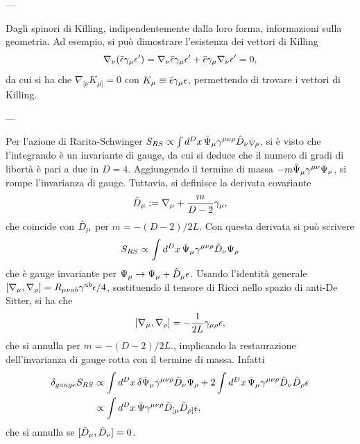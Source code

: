 ---

Dagli spinori di Killing, indipendentemente dalla loro forma, informazioni sulla geometria. Ad esempio, si può dimostrare l'esistenza dei vettori di Killing 
\begin{equation}
    \nabla_\nu(\bar{\epsilon}\gamma_\mu\epsilon') = \nabla_\nu\bar{\epsilon}\gamma_\mu\epsilon' + \bar{\epsilon}\gamma_\mu\nabla_\nu\epsilon' = 0,
\end{equation}
da cui si ha che $\nabla_{[\nu}K_{\mu]} = 0$ con $K_\mu \equiv \bar{\epsilon}\gamma_\mu\epsilon$, permettendo di trovare i vettori di Killing. 

---

Per l'azione di Rarita-Schwinger $S_{RS} \propto \int d^Dx\,\bar{\Psi}_\mu\gamma^{\mu\nu\rho}\hat{D}_\nu\psi_\rho$, si è visto che l'integrando è un invariante di gauge, da cui si deduce che il numero di gradi di libertà è pari a due in $D = 4$. Aggiungendo il termine di massa $-m\bar{\Psi}_\mu\gamma^{\mu\nu}\Psi_\nu$, si rompe l'invarianza di gauge. Tuttavia, si definisce la derivata covariante
\begin{equation}
    \tilde{D}_\mu := \nabla_\mu + \frac{m}{D - 2}\gamma_\mu,
\end{equation}
che coincide con $\hat{D}_\mu$ per $m = -(D - 2)/2L$. Con questa derivata si può scrivere 
\begin{equation}
    S_{RS} \propto \int d^Dx\,\bar{\Psi}_\mu\gamma^{\mu\nu\rho}\tilde{D}_\nu\Psi_\rho
\end{equation}
che è gauge invariante per $\Psi_\mu \to \Psi_\mu + \tilde{D}_\mu\epsilon$. Usando l'identità generale $[\nabla_\mu,\nabla_\rho] = R_{\mu\nu ab}\gamma^{ab}\epsilon/4$, sostituendo il tensore di Ricci nello spazio di anti-De Sitter, si ha che 
\begin{equation}
    [\nabla_\mu,\nabla_\rho] = -\frac{1}{2L}\gamma_{\mu\rho}\epsilon,
\end{equation}
che si annulla per $m = -(D - 2)/2L$., implicando la restaurazione dell'invarianza di gauge rotta con il termine di massa. Infatti
\begin{equation}
    \begin{split}
        \delta_{gauge}S_{RS} &\propto \int d^Dx\,\delta\bar{\Psi}_\mu\gamma^{\mu\nu\rho}\tilde{D}_\nu\Psi_\rho + 2\int d^Dx\,\bar{\Psi}_\mu\gamma^{\mu\nu\rho}\tilde{D}_\nu\tilde{D}_\rho\epsilon \\
        &\propto \int d^Dx\,\bar{\Psi}\gamma^{\mu\nu\rho}\tilde{D}_{[\mu}\tilde{D}_{\rho]}\epsilon,
    \end{split}
\end{equation}
che si annulla se $[\tilde{D}_\mu,\tilde{D}_\nu] = 0$. 

